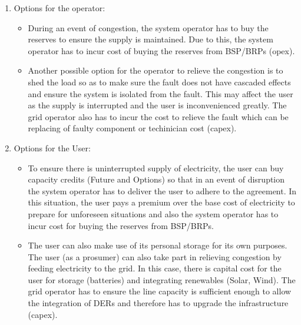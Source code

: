 \begin{enumerate}
    \item Options for the operator:
    \begin{itemize}
        \item During an event of congestion, the system operator has to buy the reserves to ensure the supply is maintained. Due to this, the system operator has to incur cost of buying the reserves from BSP/BRPs (opex). 
        \item Another possible option for the operator to relieve the congestion is to shed the load so as to make sure the fault does not have cascaded effects and ensure the system is isolated from the fault. This may affect the user as the supply is interrupted and the user is inconvenienced greatly. The grid operator also has to incur the cost to relieve the fault which can be replacing of faulty component or techinician cost (capex).
    \end{itemize}
    \item Options for the User:
    \begin{itemize}
        \item To ensure there is uninterrupted supply of electricity, the user can buy capacity credits (Future and Options) so that in an event of disruption the system operator has to deliver the user to adhere to the agreement. In this situation, the user pays a premium over the base cost of electricity to prepare for unforeseen situations and also the system operator has to incur cost for buying the reserves from BSP/BRPs.
        \item The user can also make use of its personal storage for its own purposes. The user (as a prosumer) can also take part in relieving congestion by feeding electricity to the grid. In this case, there is capital cost for the user for storage (batteries) and integrating renewables (Solar, Wind). The grid operator has to ensure the line capacity is sufficient enough to allow the integration of DERs and therefore has to upgrade the infrastructure (capex).  
    \end{itemize}
\end{enumerate}

